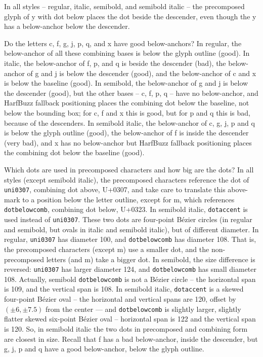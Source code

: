 \documentclass[landscape]{article}
\begin{document}
In all styles -- regular, italic, semibold, and semibold italic -- the precomposed glyph of y with dot below places the dot beside the descender, even though the y has a below-anchor below the descender.

Do the letters c, f, g, j, p, q, and x have good below-anchors?
In regular, the below-anchor of all these combining bases is below the glyph outline (good).
In italic, the below-anchor of f, p, and q is beside the descender (bad), the below-anchor of g and j is below the descender (good), and the below-anchor of c and x is below the baseline (good).
In semibold, the below-anchor of g and j is below the descender (good), but the other bases -- c, f, p, q -- have no below-anchor, and HarfBuzz fallback positioning places the combining dot below the baseline, not below the bounding box; for c, f and x this is good, but for p and q this is bad, because of the descenders.
In semibold italic, the below-anchor of c, g, j, p and q is below the glyph outline (good), the below-anchor of f is inside the descender (very bad), and x has no below-anchor but HarfBuzz fallback positioning places the combining dot below the baseline (good).

Which dots are used in precomposed characters and how big are the dots?
In all styles (except semibold italic), the precomposed characters reference the dot of \verb|uni0307|, combining dot above, U+0307, and take care to translate this above-mark to a position below the letter outline, except for m, which references \verb|dotbelowcomb|, combining dot below, U+0323.
In semibold italic, \verb|dotaccent| is used instead of \verb|uni0307|.
These two dots are four-point Bézier circles (in regular and semibold, but ovals in italic and semibold italic), but of different diameter. 
In regular, \verb|uni0307| has diameter 100, and \verb|dotbelowcomb| has diameter 108.
That is, the precomposed characters (except m) use a smaller dot, and the non-precomposed letters (and m) take a bigger dot.
In semibold, the size difference is reversed: \verb|uni0307| has larger diameter 124, and \verb|dotbelowcomb| has small diameter 108. 
Actually, semibold \verb|dotbelowcomb| is not a Bézier circle -- the horizontal span is 109, and the vertical span is 108.
In semibold italic, \verb|dotaccent| is a skewed four-point Bézier oval -- the horizontal and vertical spans are 120, 
offset by $(\pm 6, \pm 7.5)$ from the center --- and \verb|dotbelowcomb| is slightly larger, slightly flatter skewed six-point Bézier oval -- horizontal span is 122 and the vertical span is 120.
So, in semibold italic the two dots in precomposed and combining form are closest in size. 
Recall that f has a bad below-anchor, inside the descender, but g, j, p and q have a good below-anchor, below the glyph outline.
\end{document}
